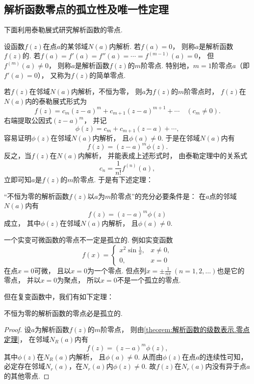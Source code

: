 \subsection{解析函数零点的孤立性及唯一性定理}
下面利用泰勒展式研究解析函数的零点.
\begin{definition}\label{definition:解析函数的级数表示.零点}
设函数\(f(z)\)在点\(a\)的某邻域\(N(a)\)内解析.
若\(f(a)=0\)，
则称\(a\)是解析函数\(f(z)\)的.
若\(f(a)=f'(a)=f''(a)=\dotsb=f^{(m-1)}(a)=0\)，
但\(f^{(m)}(a)\neq0\)，
则称\(a\)是解析函数\(f(z)\)的\(m\)阶零点.
特别地，\(m=1\)阶零点\(a\)（即\(f'(a)=0\)），
又称为\(f(z)\)的简单零点.
\end{definition}

若\(f(z)\)在邻域\(N(a)\)内解析，不恒为零，
则\(a\)为\(f(z)\)的\(m\)阶零点时，
\(f(z)\)在\(N(a)\)内的泰勒展式形式为\[
	f(z) = c_m (z-a)^m + c_{m+1} (z-a)^{m+1} + \dotsb \quad(c_m\neq0).
\]
右端提取公因式\((z-a)^m\)，
并记\[
	\phi(z) = c_m + c_{m+1} (z-a) + \dotsb,
\]
容易证明\(\phi(z)\)在邻域\(N(a)\)内解析，
且\(\phi(a)\neq0\).
于是在邻域\(N(a)\)内有\[
	f(z) = (z-a)^m \phi(z).
\]
反之，当\(f(z)\)在\(N(a)\)内解析，
并能表成上述形式时，
由泰勒定理中的关系式\[
	c_n = \frac1{n!} f^{(n)}(a),
\]
立即可知\(a\)是\(f(z)\)的\(m\)阶零点.
于是有下述定理：
\begin{theorem}\label{theorem:解析函数的级数表示.零点定理}
“不恒为零的解析函数\(f(z)\)以\(a\)为\(m\)阶零点”的充分必要条件是：
在\(a\)点的邻域\(N(a)\)内有\[
	f(z) = (z-a)^m \phi(z)
\]成立，
其中\(\phi(z)\)在邻域\(N(a)\)内解析，
且\(\phi(a)\neq0\).
\end{theorem}

一个实变可微函数的零点不一定是孤立的.
例如实变函数\[
	f(x) = \left\{ \begin{array}{cl}
		x^2 \sin\frac1x, & x\neq0, \\
		0, & x=0
	\end{array} \right.
\]在点\(x=0\)可微，
且以\(x=0\)为一个零点.
但点列\(x = \pm\frac1{n\pi}\ (n=1,2,\dotsc)\)也是它的零点，
并以\(x = 0\)为聚点，
所以\(x = 0\)不是一个孤立的零点.

但在复变函数中，我们有如下定理：
\begin{theorem}\label{theorem:解析函数的级数表示.解析函数的零点的孤立性}
不恒为零的解析函数的零点必是孤立的.
\begin{proof}
设\(a\)为解析函数\(f(z)\)的\(m\)阶零点，
则由\cref{theorem:解析函数的级数表示.零点定理}，
在邻域\(N_R(a)\)内有\[
	f(z) = (z-a)^m \phi(z),
\]
其中\(\phi(z)\)在\(N_R(a)\)内解析，
且\(\phi(a)\neq0\).
从而由\(\phi(z)\)在点\(a\)的连续性可知，
必定存在邻域\(N_r(a)\)，在\(N_r(a)\)内\(\phi(z)\neq0\).
故\(f(z)\)在\(N_r(a)\)内没有异于点\(a\)的其他零点.
\end{proof}
\end{theorem}


